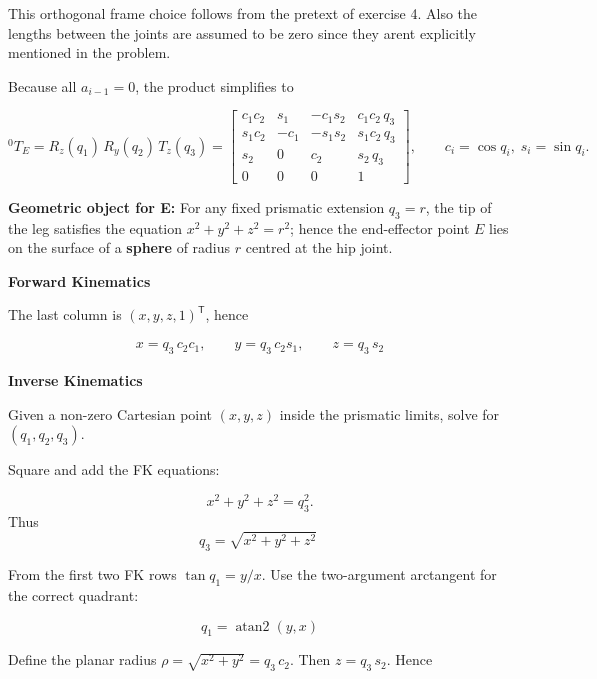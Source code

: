 \documentclass[12pt,a4paper]{article}
\begin{document}
This orthogonal frame choice follows from the pretext of exercise 4. Also the lengths between the joints are assumed to be zero since they arent explicitly mentioned in the problem.


Because all $a_{i-1}=0$, the product simplifies to

\[
{}^{0}\!T_E
  = R_{z}(q_1)\,R_{y}(q_2)\,T_{z}(q_3)
  =
  \begin{bmatrix}
   c_{1}c_{2} &  s_{1} & -c_{1}s_{2} & c_{1}c_{2}\,q_{3}\\
   s_{1}c_{2} & -c_{1} & -s_{1}s_{2} & s_{1}c_{2}\,q_{3}\\
   s_{2}      &  0     &  c_{2}      & s_{2}\,q_{3}\\
   0&0&0&1
  \end{bmatrix},
\qquad
c_{i}\!=\!\cos q_{i},\; s_{i}\!=\!\sin q_{i}.
\]


\textbf{Geometric object for E:}
For any fixed prismatic extension \(q_{3}=r\), the tip of the leg satisfies the equation
\(x^{2}+y^{2}+z^{2}=r^{2}\); hence the end-effector point \(E\) lies on the surface of a
\textbf{sphere} of radius \(r\) centred at the hip joint.


\textbf{Forward Kinematics}

The last column is \((x,y,z,1)^{\mathsf T}\), hence

\begin{align*}
x=q_{3}\,c_{2}c_{1},\qquad
y=q_{3}\,c_{2}s_{1},\qquad
z=q_{3}\,s_{2}
\end{align*}


\textbf{Inverse Kinematics}

Given a non-zero Cartesian point \((x,y,z)\) inside the prismatic limits, solve
for \((q_{1},q_{2},q_{3})\).

Square and add the FK equations:

\[
x^{2}+y^{2}+z^{2}=q_{3}^{2}.
\]
Thus
\[
q_{3}=\sqrt{x^{2}+y^{2}+z^{2}}\;
\]

From the first two FK rows
\(\tan q_{1}=y/x\).
Use the two-argument arctangent for the correct quadrant:

\[
q_{1}=\operatorname{atan2}(y,x)
\]

Define the planar radius \(\rho=\sqrt{x^{2}+y^{2}}=q_{3}\,c_{2}\).
Then \(z=q_{3}\,s_{2}\).  Hence
\end{document}
